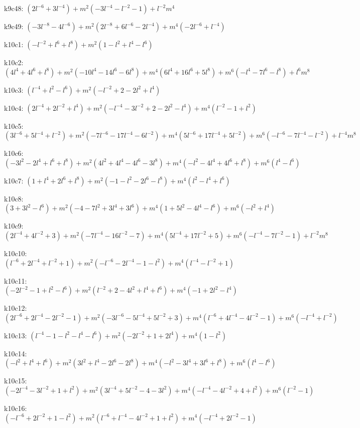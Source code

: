k9c48: $ (2l^{-6}+3l^{-4})  +m^{2}(-3l^{-4}-l^{-2}-1)  +l^{-2}m^{4} $ 

k9c49: $ (-3l^{-8}-4l^{-6})  +m^{2}(2l^{-8}+6l^{-6}-2l^{-4})  +m^{4}(-2l^{-6}+l^{-4}) $ 

k10c1: $ (-l^{-2}+l^{6}+l^{8})  +m^{2}(1-l^{2}+l^{4}-l^{6}) $ 

k10c2: $ (4l^{4}+4l^{6}+l^{8})  +m^{2}(-10l^{4}-14l^{6}-6l^{8})  +m^{4}(6l^{4}+16l^{6}+5l^{8})  +m^{6}(-l^{4}-7l^{6}-l^{8})  +l^{6}m^{8} $ 

k10c3: $ (l^{-4}+l^{2}-l^{6})  +m^{2}(-l^{-2}+2-2l^{2}+l^{4}) $ 

k10c4: $ (2l^{-4}+2l^{-2}+l^{4})  +m^{2}(-l^{-4}-3l^{-2}+2-2l^{2}-l^{4})  +m^{4}(l^{-2}-1+l^{2}) $ 

k10c5: $ (3l^{-6}+5l^{-4}+l^{-2})  +m^{2}(-7l^{-6}-17l^{-4}-6l^{-2})  +m^{4}(5l^{-6}+17l^{-4}+5l^{-2})  +m^{6}(-l^{-6}-7l^{-4}-l^{-2})  +l^{-4}m^{8} $ 

k10c6: $ (-3l^{2}-2l^{4}+l^{6}+l^{8})  +m^{2}(4l^{2}+4l^{4}-4l^{6}-3l^{8})  +m^{4}(-l^{2}-4l^{4}+4l^{6}+l^{8})  +m^{6}(l^{4}-l^{6}) $ 

k10c7: $ (1+l^{4}+2l^{6}+l^{8})  +m^{2}(-1-l^{2}-2l^{6}-l^{8})  +m^{4}(l^{2}-l^{4}+l^{6}) $ 

k10c8: $ (3+3l^{2}-l^{6})  +m^{2}(-4-7l^{2}+3l^{4}+3l^{6})  +m^{4}(1+5l^{2}-4l^{4}-l^{6})  +m^{6}(-l^{2}+l^{4}) $ 

k10c9: $ (2l^{-4}+4l^{-2}+3)  +m^{2}(-7l^{-4}-16l^{-2}-7)  +m^{4}(5l^{-4}+17l^{-2}+5)  +m^{6}(-l^{-4}-7l^{-2}-1)  +l^{-2}m^{8} $ 

k10c10: $ (l^{-6}+2l^{-4}+l^{-2}+1)  +m^{2}(-l^{-6}-2l^{-4}-1-l^{2})  +m^{4}(l^{-4}-l^{-2}+1) $ 

k10c11: $ (-2l^{-2}-1+l^{2}-l^{6})  +m^{2}(l^{-2}+2-4l^{2}+l^{4}+l^{6})  +m^{4}(-1+2l^{2}-l^{4}) $ 

k10c12: $ (2l^{-6}+2l^{-4}-2l^{-2}-1)  +m^{2}(-3l^{-6}-5l^{-4}+5l^{-2}+3)  +m^{4}(l^{-6}+4l^{-4}-4l^{-2}-1)  +m^{6}(-l^{-4}+l^{-2}) $ 

k10c13: $ (l^{-4}-1-l^{2}-l^{4}-l^{6})  +m^{2}(-2l^{-2}+1+2l^{4})  +m^{4}(1-l^{2}) $ 

k10c14: $ (-l^{2}+l^{4}+l^{6})  +m^{2}(3l^{2}+l^{4}-2l^{6}-2l^{8})  +m^{4}(-l^{2}-3l^{4}+3l^{6}+l^{8})  +m^{6}(l^{4}-l^{6}) $ 

k10c15: $ (-2l^{-4}-3l^{-2}+1+l^{2})  +m^{2}(3l^{-4}+5l^{-2}-4-3l^{2})  +m^{4}(-l^{-4}-4l^{-2}+4+l^{2})  +m^{6}(l^{-2}-1) $ 

k10c16: $ (-l^{-6}+2l^{-2}+1-l^{2})  +m^{2}(l^{-6}+l^{-4}-4l^{-2}+1+l^{2})  +m^{4}(-l^{-4}+2l^{-2}-1) $ 

